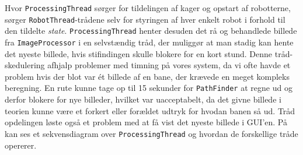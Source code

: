 Hvor \texttt{ProcessingThread} sørger for tildelingen af kager og opstart af robotterne, sørger \texttt{RobotThread}-trådene selv for styringen af hver enkelt robot i forhold til den tildelte \textit{state}. \texttt{ProcessingThread} henter desuden det rå og behandlede billede fra \texttt{ImageProcessor} i en selvstændig tråd, der muliggør at man stadig kan hente det nyeste billede, hvis stifindingen skulle blokere for en kort stund. Denne tråd-skedulering afhjalp problemer med timning på vores system, da vi ofte havde et problem hvis der blot var ét billede af en bane, der krævede en meget kompleks beregning. En rute kunne tage op til 15 sekunder for \texttt{PathFinder} at regne ud og derfor blokere for nye billeder, hvilket var uacceptabelt, da det givne billede i teorien kunne være et forkert eller forældet udtryk for hvodan banen så ud. Tråd opdelingen løste også et problem med at få vist det nyeste billede i GUI’en. På  kan ses et sekvensdiagram over \texttt{ProcessingThread} og hvordan de forskellige tråde opererer.

